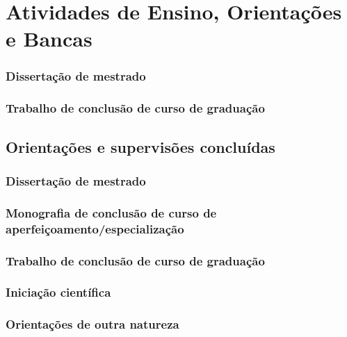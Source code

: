 

\chapter{Atividades de Ensino, Orientações e Bancas}\label{cap:ensino}

\subsection{Dissertação de mestrado}



\subsection{Trabalho de conclusão de curso de graduação}



\section{Orientações e supervisões concluídas}

\subsection{Dissertação de mestrado}



\subsection{Monografia de conclusão de curso de aperfeiçoamento/especialização}



\subsection{Trabalho de conclusão de curso de graduação}



\subsection{Iniciação científica}



\subsection{Orientações de outra natureza}

